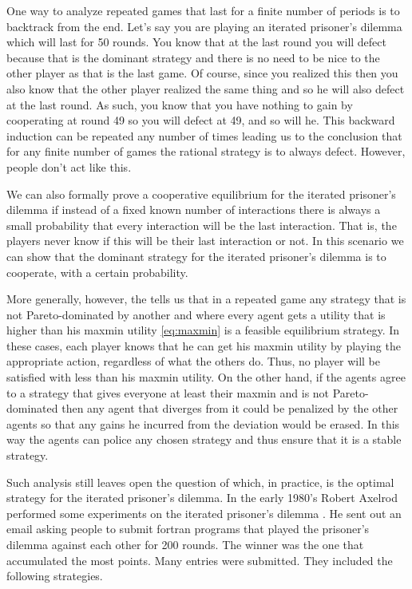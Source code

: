One way to analyze repeated games that last for a finite number of
periods is to backtrack from the end.  Let's say you are playing an
iterated prisoner's dilemma which will last for 50 rounds. You know
that at the last round you will defect because that is the dominant
strategy and there is no need to be nice to the other player as that
is the last game. Of course, since you realized this then you also
know that the other player realized the same thing and so he will also
defect at the last round. As such, you know that you have nothing to
gain by cooperating at round 49 so you will defect at 49, and so will
he. This backward induction can be repeated any number of times
leading us to the conclusion that for any finite number of games the
rational strategy is to always defect. However, people don't act like
this.

We can also formally prove a cooperative equilibrium for the iterated
prisoner's dilemma if instead of a fixed known number of interactions
there is always a small probability that every interaction will be the
last interaction. That is, the players never know if this will be
their last interaction or not. In this scenario we can show that the
dominant strategy for the iterated prisoner's dilemma is to cooperate,
with a certain probability.

More generally, however, the  tells us that in a
repeated game any strategy that is not Pareto-dominated by another and
where every agent gets a utility that is higher than his maxmin
utility \eqref{eq:maxmin} is a feasible equilibrium strategy.  In
these cases, each player knows that he can get his maxmin utility by
playing the appropriate action, regardless of what the others do.
Thus, no player will be satisfied with less than his maxmin utility.
On the other hand, if the agents agree to a strategy that gives
everyone at least their maxmin and is not Pareto-dominated then any
agent that diverges from it could be penalized by the other agents so
that any gains he incurred from the deviation would be erased. In this
way the agents can police any chosen strategy and thus ensure that it
is a stable strategy.

\medskip
Such analysis still leaves open the question of which, in practice, is
the optimal strategy for the iterated prisoner's dilemma. In the early
1980's Robert Axelrod performed some experiments on the iterated
prisoner's dilemma \cite{axelrod:84}. He sent out an email asking
people to submit fortran programs that played the prisoner's dilemma
against each other for 200 rounds. The winner was the one that
accumulated the most points.  Many entries were submitted.  They
included the following strategies.

